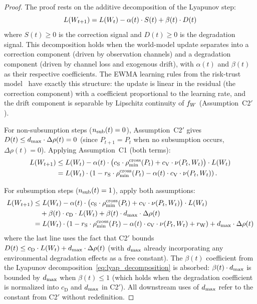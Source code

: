 \begin{proof}
The proof rests on the additive decomposition of the Lyapunov step:
\begin{equation}
\label{eq:lyap_decomposition}
L(W_{t+1}) = L(W_t) - \alpha(t) \cdot S(t)
  + \beta(t) \cdot D(t)
\end{equation}
where $S(t) \geq 0$ is the correction signal and $D(t) \geq 0$ is the
degradation signal.  This decomposition holds when the world-model
update separates into a correction component (driven by observation
channels) and a degradation component (driven by channel loss and
exogenous drift), with $\alpha(t)$ and $\beta(t)$ as their respective
coefficients.  The EWMA learning rules from the risk-trust model~\citep{lasser2026scm}
have exactly this structure: the update is linear in the residual (the
correction component) with a coefficient proportional to the learning
rate, and the drift component is separable by Lipschitz continuity of
$f_{W}$ (Assumption~C2$'$).

For non-subsumption steps ($n_{\mathrm{sub}}(t) = 0$), Assumption~C2$'$ gives
$D(t) \leq d_{\mathrm{max}} \cdot \Delta\rho(t) = 0$ (since $P_{t+1} = P_t$
when no subsumption occurs, $\Delta\rho(t) = 0$).  Applying
Assumption~C1 (both terms):
\begin{align*}
L(W_{t+1})
&\leq L(W_t) - \alpha(t) \cdot \bigl(c_{\mathrm{S}} \cdot
  \rho_{\min}^{\mathrm{cross}}(P_t) + c_{\mathrm{V}} \cdot \nu(P_t, W_t)\bigr)
  \cdot L(W_t) \\
&= L(W_t) \cdot \left(1 - r_{\mathrm{S}} \cdot \rho_{\min}^{\mathrm{cross}}(P_t)
  - \alpha(t) \cdot c_{\mathrm{V}} \cdot \nu(P_t, W_t)\right).
\end{align*}

For subsumption steps ($n_{\mathrm{sub}}(t) = 1$), apply both assumptions:
\begin{align*}
L(W_{t+1})
&\leq L(W_t)
  - \alpha(t) \cdot \bigl(c_{\mathrm{S}} \cdot \rho_{\min}^{\mathrm{cross}}(P_t)
  + c_{\mathrm{V}} \cdot \nu(P_t, W_t)\bigr) \cdot L(W_t) \\
&\quad + \beta(t) \cdot c_{\mathrm{D}} \cdot L(W_t)
  + \beta(t) \cdot d_{\mathrm{max}} \cdot \Delta\rho(t) \\
&= L(W_t) \cdot
  \left(1 - r_{\mathrm{S}} \cdot \rho_{\min}^{\mathrm{cross}}(P_t)
  - \alpha(t) \cdot c_{\mathrm{V}} \cdot \nu(P_t, W_t)
  + r_{\mathrm{W}}\right)
  + d_{\mathrm{max}} \cdot \Delta\rho(t)
\end{align*}
where the last line uses the fact that C2$'$ bounds
$D(t) \leq c_{\mathrm{D}} \cdot L(W_t) + d_{\mathrm{max}} \cdot
\Delta\rho(t)$ (with $d_{\mathrm{max}}$ already incorporating any environmental
degradation effects as a free constant).  The $\beta(t)$ coefficient
from the Lyapunov decomposition~\eqref{eq:lyap_decomposition} is
absorbed: $\beta(t) \cdot d_{\mathrm{max}}$ is bounded by $d_{\mathrm{max}}$ when
$\beta(t) \leq 1$ (which holds when the degradation coefficient is
normalized into $c_{\mathrm{D}}$ and $d_{\mathrm{max}}$ in C2$'$).  All
downstream uses of $d_{\mathrm{max}}$ refer to the constant from C2$'$ without
redefinition.
\end{proof}


